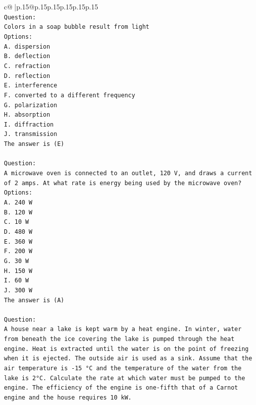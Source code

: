 \documentclass{article}
\begin{document}
{\begin{supertabular}{c@{$\;$}|p{.15\linewidth}@{}p{.15\linewidth}p{.15\linewidth}p{.15\linewidth}p{.15\linewidth}p{.15\linewidth}}
{{{\\ 
\texttt{Question:} \\
\texttt{Colors in a soap bubble result from light} \\
\texttt{Options:} \\
\texttt{A. dispersion} \\
\texttt{B. deflection} \\
\texttt{C. refraction} \\
\texttt{D. reflection} \\
\texttt{E. interference} \\
\texttt{F. converted to a different frequency} \\
\texttt{G. polarization} \\
\texttt{H. absorption} \\
\texttt{I. diffraction} \\
\texttt{J. transmission} \\
\texttt{The answer is (E)} \\
\\ 
\texttt{Question:} \\
\texttt{A microwave oven is connected to an outlet, 120 V, and draws a current of 2 amps. At what rate is energy being used by the microwave oven?} \\
\texttt{Options:} \\
\texttt{A. 240 W} \\
\texttt{B. 120 W} \\
\texttt{C. 10 W} \\
\texttt{D. 480 W} \\
\texttt{E. 360 W} \\
\texttt{F. 200 W} \\
\texttt{G. 30 W} \\
\texttt{H. 150 W} \\
\texttt{I. 60 W} \\
\texttt{J. 300 W} \\
\texttt{The answer is (A)} \\
\\ 
\texttt{Question:} \\
\texttt{A house near a lake is kept warm by a heat engine. In winter, water from beneath the ice covering the lake is pumped through the heat engine. Heat is extracted until the water is on the point of freezing when it is ejected. The outside air is used as a sink. Assume that the air temperature is {-}15 °C and the temperature of the water from the lake is 2°C. Calculate the rate at which water must be pumped to the engine. The efficiency of the engine is one{-}fifth that of a Carnot engine and the house requires 10 kW.} \\
}}}
\end{supertabular}}
\end{document}

